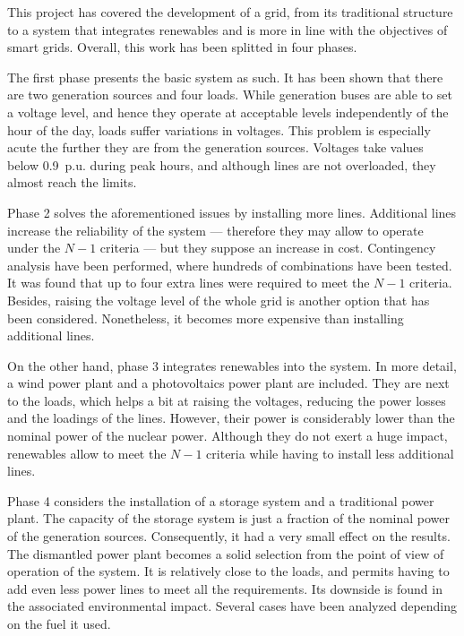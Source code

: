 This project has covered the development of a grid, from its traditional structure to a system that integrates renewables and is more in line with the objectives of smart grids. Overall, this work has been splitted in four phases.

The first phase presents the basic system as such. It has been shown that there are two generation sources and four loads. While generation buses are able to set a voltage level, and hence they operate at acceptable levels independently of the hour of the day, loads suffer variations in voltages. This problem is especially acute the further they are from the generation sources. Voltages take values below 0.9~p.u. during peak hours, and although lines are not overloaded, they almost reach the limits. 

Phase 2 solves the aforementioned issues by installing more lines. Additional lines increase the reliability of the system --- therefore they may allow to operate under the $N-1$ criteria --- but they suppose an increase in cost. Contingency analysis have been performed, where hundreds of combinations have been tested. It was found that up to four extra lines were required to meet the $N-1$ criteria. Besides, raising the voltage level of the whole grid is another option that has been considered. Nonetheless, it becomes more expensive than installing additional lines.

On the other hand, phase 3 integrates renewables into the system. In more detail, a wind power plant and a photovoltaics power plant are included. They are next to the loads, which helps a bit at raising the voltages, reducing the power losses and the loadings of the lines. However, their power is considerably lower than the nominal power of the nuclear power. Although they do not exert a huge impact, renewables allow to meet the $N-1$ criteria while having to install less additional lines.

Phase 4 considers the installation of a storage system and a traditional power plant. The capacity of the storage system is just a fraction of the nominal power of the generation sources. Consequently, it had a very small effect on the results. The dismantled power plant becomes a solid selection from the point of view of operation of the system. It is relatively close to the loads, and permits having to add even less power lines to meet all the requirements. Its downside is found in the associated environmental impact. Several cases have been analyzed depending on the fuel it used. 


